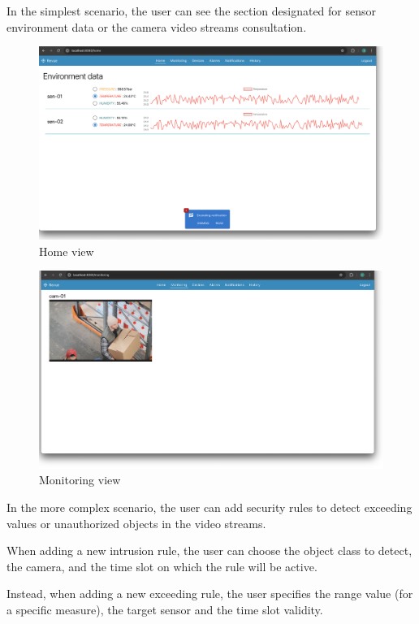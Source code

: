 \documentclass{scrartcl}
\begin{document}
    In the simplest scenario, the user can see the section designated for sensor environment data or the camera video streams consultation.

    \begin{figure}
        \centering
        \includegraphics[scale=0.25]{img/usage/home_view}
        \caption{Home view}
        \label{fig:home-view}
    \end{figure}
    \begin{figure}
        \centering
        \includegraphics[scale=0.25]{img/usage/camera_view}
        \caption{Monitoring view}
        \label{fig:monitoring-view}
    \end{figure}


    In the more complex scenario, the user can add security rules to detect exceeding values or unauthorized objects in the video streams.

    When adding a new intrusion rule, the user can choose the object class to detect, the camera, and the time slot on which the rule will be active.

    Instead, when adding a new exceeding rule, the user specifies the range value (for a specific measure), the target sensor and the time slot validity.
\end{document}
